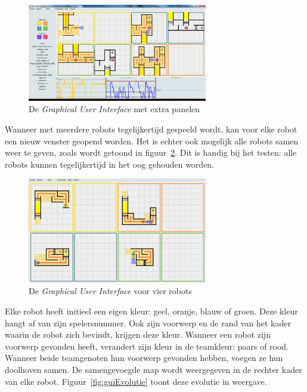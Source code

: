 \documentclass[eind]{penoverslag}
\begin{document}
\begin{figure}[h]
\centering
	\includegraphics[width=0.7\textwidth]{guiALL}
\caption{De \textit{Graphical User Interface} met extra panelen}
\label{fig:guiAll}
\end{figure}

Wanneer met meerdere robots tegelijkertijd gespeeld wordt, kan voor elke robot een nieuw venster geopend worden. Het is echter ook mogelijk alle robots samen weer te geven, zoals wordt getoond in figuur~\ref{fig:gui4}. Dit is handig bij het testen: alle robots kunnen tegelijkertijd in het oog gehouden worden.

\begin{figure}[h]
\centering
	\includegraphics[width=0.7\textwidth]{gui4Robots}
\caption{De \textit{Graphical User Interface} voor vier robots}
\label{fig:gui4}
\end{figure}

Elke robot heeft initieel een eigen kleur: geel, oranje, blauw of groen. Deze kleur hangt af van zijn spelersnummer. Ook zijn voorwerp en de rand van het kader waarin de robot zich bevindt, krijgen deze kleur. Wanneer een robot zijn voorwerp gevonden heeft, verandert zijn kleur in de teamkleur: paars of rood. Wanneer beide teamgenoten hun voorwerp gevonden hebben, voegen ze hun doolhoven samen. De samengevoegde map wordt weergegeven in de rechter kader van elke robot. Figuur~\ref{fig:guiEvolutie} toont deze evolutie in weergave.\\
\end{document}
